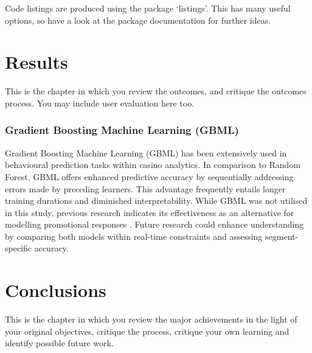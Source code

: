 \documentclass[12pt,a4paper]{report}
\begin{document}
Code listings are produced using the package `listings'.  This has many useful options, so have a look at the package documentation for further ideas.

\chapter{Results}

This is the chapter in which you review the outcomes, and critique the outcomes process. You may include user evaluation here too.


\subsection{Gradient Boosting Machine Learning (GBML)}

Gradient Boosting Machine Learning (GBML) has been extensively used in behavioural prediction tasks within casino analytics. In comparison to Random Forest, GBML offers enhanced predictive accuracy by sequentially addressing errors made by preceding learners. This advantage frequently entails longer training durations and diminished interpretability. While GBML was not utilised in this study, previous research indicates its effectiveness as an alternative for modelling promotional responses \citep{Omike2022b}. Future research could enhance understanding by comparing both models within real-time constraints and assessing segment-specific accuracy.


\chapter{Conclusions}


This is the chapter in which you review the major achievements in the light of your original objectives, critique the process, critique your own learning and identify possible future work.

\end{document}
